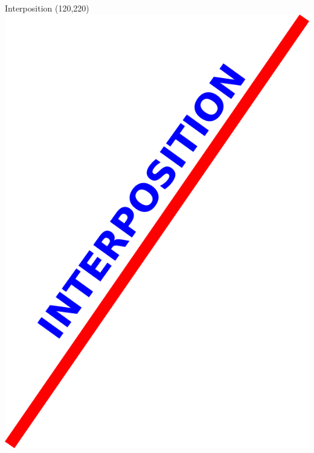 \begin{frame}{Interposition}
    \Put(120,220){\includegraphics[height=0.8\textheight]{img/line.png}}
\end{frame}

